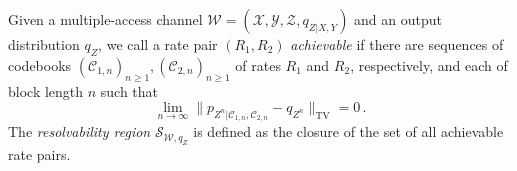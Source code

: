 \documentclass[journal]{IEEEtran}
\newcommand{\channelpmf}{q}
\newcommand{\codebookpmf}{p}
\newcommand{\codebookRateOne}{R_1}
\newcommand{\codebookRateTwo}{R_2}
\newcommand{\channelInOne}{X}
\newcommand{\channelInOneAlph}{\mathcal{X}}
\newcommand{\channelInTwo}{Y}
\newcommand{\channelInTwoAlph}{\mathcal{Y}}
\newcommand{\channelOut}{Z}
\newcommand{\channelOutAlph}{\mathcal{Z}}
\newcommand{\channel}{\mathcal{W}}
\newcommand{\codebook}{\mathcal{C}}
\newcommand{\codebookBlocklength}{n}
\newcommand{\totalvariation}[1]{\lVert #1 \rVert_\mathrm{TV}}
\newcommand{\capacityRegion}[2]{\mathcal{S}_{#1, #2}}
\begin{document}
Given a multiple-access channel
$\channel = (\channelInOneAlph, \channelInTwoAlph, \channelOutAlph,
\channelpmf_{\channelOut | \channelInOne, \channelInTwo})$ and an
output distribution $\channelpmf_\channelOut$, we call a rate pair
$(\codebookRateOne, \codebookRateTwo)$ \emph{achievable} if there are
sequences of codebooks
$(\codebook_{1,\codebookBlocklength})_{\codebookBlocklength \geq 1},
(\codebook_{2,\codebookBlocklength})_{\codebookBlocklength \geq 1}$ of
rates $\codebookRateOne$ and $\codebookRateTwo$, respectively, and
each of block length $\codebookBlocklength$ such that
\[
\lim\limits_{\codebookBlocklength \rightarrow \infty}
  \totalvariation{\codebookpmf_{\channelOut^\codebookBlocklength | \codebook_{1,\codebookBlocklength}, \codebook_{2,\codebookBlocklength}} - \channelpmf_{\channelOut^\codebookBlocklength}}
=
0\,.
\]
The \emph{resolvability region}
$\capacityRegion{\channel}{\channelpmf_\channelOut}$ is defined as the
closure of the set of all achievable rate pairs.
\end{document}
